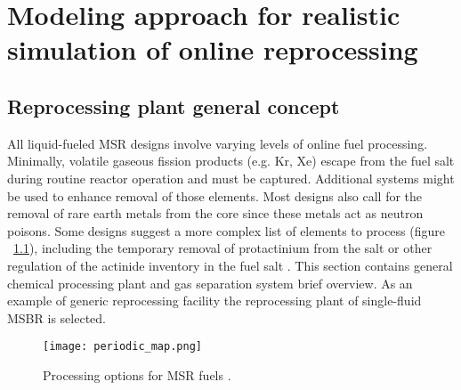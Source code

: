 \chapter[Modeling approach for realistic simulation of online reprocessing]{Modeling approach for realistic simulation of online reprocessing}

\section{Reprocessing plant general concept}
All liquid-fueled \gls{MSR} designs involve varying levels of online fuel processing. Minimally, volatile gaseous fission products (e.g. Kr, Xe) escape from the fuel salt during routine reactor operation and must be captured. Additional systems might be used to enhance removal of those elements. Most designs also call for the removal of rare earth metals from the core since these metals act as neutron poisons. Some designs suggest a more complex list of elements to process (figure ~\ref{fig:periodic_tab}), including the temporary removal of protactinium from the salt or other regulation of the actinide inventory in the fuel salt \cite{ahmad_neutronics_2015}. This section 
contains general chemical processing plant and gas separation system brief 
overview. As an example of generic reprocessing facility the reprocessing plant 
of single-fluid \gls{MSBR} is selected. 
\begin{figure}[htp!] %
  \centering
  \texttt{[image: periodic\_map.png]}
  \caption{Processing options for \gls{MSR} fuels \cite{ahmad_neutronics_2015}.}
  \label{fig:periodic_tab}
\end{figure}

